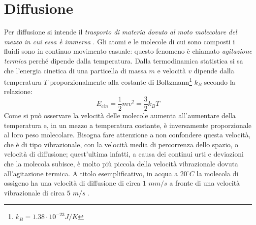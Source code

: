 \section{Diffusione}\label{diffusione}

Per diffusione si intende il \textit{trasporto di materia dovuto al moto molecolare del mezzo in cui essa è immersa} \cite{salsa}. Gli atomi e le molecole di cui sono composti i fluidi sono in continuo movimento casuale: questo fenomeno è chiamato \textit{agitazione termica} perché dipende dalla temperatura. Dalla termodinamica statistica si sa che l'energia cinetica di una particella di massa $m$ e velocità $v$ dipende dalla temperatura $T$ proporzionalmente alla costante di Boltzmann\footnote{$k_B = 1.38\cdot10^{-23} J/K$} $k_B$ secondo la relazione:
$$E_{cin}= \frac{1}{2}mv^2 = \frac{3}{2}k_B T$$
Come si può osservare la velocità delle molecole aumenta all'aumentare della temperatura e, in un mezzo a temperatura costante, è inversamente proporzionale al loro peso molecolare. Bisogna fare attenzione a non confondere questa velocità, che è di tipo vibrazionale, con la velocità media di percorrenza dello spazio, o velocità di diffusione; quest'ultima infatti, a causa dei continui urti e deviazioni che la molecola subisce, è molto più piccola della velocità vibrazionale dovuta all'agitazione termica. A titolo esemplificativo, in acqua a $20^{\circ} C$  la molecola di ossigeno ha una velocità di diffusione di circa $1$ $mm/s$ a fronte di una velocità vibrazionale di circa $5$ $m/s$ \cite{fisica}.

